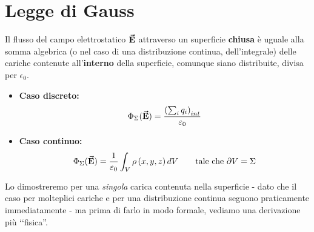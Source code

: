 \section{Legge di Gauss}
\begin{theorema}
	Il flusso del campo elettrostatico $\vb*{\va{E}}$ attraverso un superficie \textbf{chiusa} è uguale alla somma algebrica (\textrm{o nel caso di una distribuzione continua}, dell'integrale) delle cariche contenute all'\textbf{interno} della superficie, comunque siano distribuite, divisa per $\epsilon_0$.
	\begin{itemize}
		\item \textbf{Caso discreto:}
		\begin{equation}
			\Phi_\Sigma(\vb*{\va{E}})=\frac{\left(\sum_i q_i\right)_{int}}{\varepsilon_0}\label{LeggeGaussDiscreta}
		\end{equation}
		\item \textbf{Caso continuo:}
		\begin{equation}
			\Phi_\Sigma(\vb*{\va{E}})=\frac{1}{\varepsilon_0}\int_{V}\rho\left(x,y,z\right)dV\qquad\text{tale che}\ \partial V=\Sigma\label{LeggeGaussContinua}
		\end{equation}
	\end{itemize}
\end{theorema}
Lo dimostreremo per una \textit{singola} carica contenuta nella superficie - dato che il caso per molteplici cariche e per una distribuzione continua seguono praticamente immediatamente - ma prima di farlo in modo formale, vediamo una derivazione più ‘‘fisica''.
